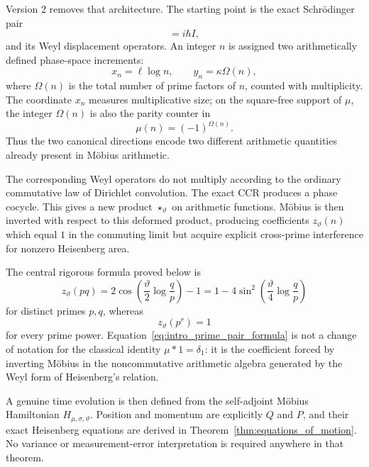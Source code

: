 \documentclass[11pt]{amsart}
\numberwithin{equation}{section}
\theoremstyle{plain}
\theoremstyle{definition}
\theoremstyle{remark}
\newcommand{\Om}{\Omega}
\newcommand{\twconv}{\star_{\vartheta}}
\begin{document}
Version 2 removes that architecture.  The starting point is the exact
Schr\"odinger pair
\begin{equation}
[Q,P]=i\hbar I,
\label{eq:intro_CCR}
\end{equation}
and its Weyl displacement operators.  An integer $n$ is assigned two
arithmetically defined phase-space increments:
\begin{equation}
x_n=\ell\log n,
\qquad
y_n=\kappa\Om(n),
\label{eq:intro_phase_space_coordinates}
\end{equation}
where $\Om(n)$ is the total number of prime factors of $n$, counted with
multiplicity.  The coordinate $x_n$ measures multiplicative size; on the
square-free support of $\mu$, the integer $\Om(n)$ is also the parity counter
in
\begin{equation}
\mu(n)=(-1)^{\Om(n)}.
\label{eq:intro_mobius_parity}
\end{equation}
Thus the two canonical directions encode two different arithmetic quantities
already present in M\"obius arithmetic.

The corresponding Weyl operators do not multiply according to the ordinary
commutative law of Dirichlet convolution.  The exact CCR produces a phase
cocycle.  This gives a new product $\twconv$ on arithmetic functions.  M\"obius
is then inverted with respect to this deformed product, producing coefficients
$z_{\vartheta}(n)$ which equal $1$ in the commuting limit but acquire explicit
cross-prime interference for nonzero Heisenberg area.

The central rigorous formula proved below is
\begin{equation}
z_{\vartheta}(pq)
=
2\cos\!\left(\frac{\vartheta}{2}\log\frac{q}{p}\right)-1
=
1-4\sin^2\!\left(\frac{\vartheta}{4}\log\frac{q}{p}\right)
\label{eq:intro_prime_pair_formula}
\end{equation}
for distinct primes $p,q$, whereas
\begin{equation}
z_{\vartheta}(p^r)=1
\label{eq:intro_prime_power_formula}
\end{equation}
for every prime power.  Equation~\eqref{eq:intro_prime_pair_formula} is not a
change of notation for the classical identity $\mu*1=\delta_1$: it is the
coefficient forced by inverting M\"obius in the noncommutative arithmetic
algebra generated by the Weyl form of Heisenberg's relation.

A genuine time evolution is then defined from the self-adjoint M\"obius
Hamiltonian $H_{\mu,\sigma,\vartheta}$.  Position and momentum are explicitly
$Q$ and $P$, and their exact Heisenberg equations are derived in
Theorem~\ref{thm:equations_of_motion}.  No variance or measurement-error
interpretation is required anywhere in that theorem.
\end{document}
